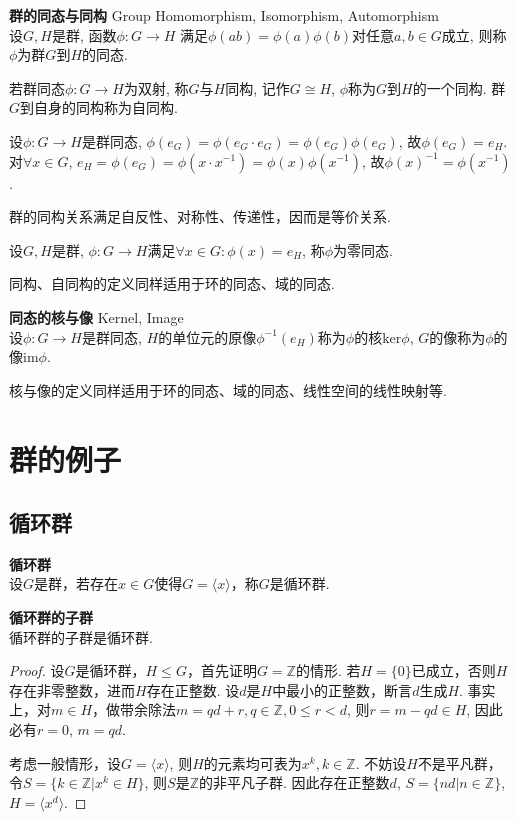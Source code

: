 \begin{dfn} \textbf{群的同态与同构} Group Homomorphism, Isomorphism, Automorphism\\
设$G,H$是群, 函数$\phi: G\to H$ 满足$\phi(ab)=\phi(a)\phi(b)$对任意$a,b\in G$成立, 则称$\phi$为群$G$到$H$的同态. 

若群同态$\phi:G\to H$为双射, 称$G$与$H$同构, 记作$G\cong H$, $\phi$称为$G$到$H$的一个同构. 群$G$到自身的同构称为自同构.
\end{dfn}
设$\phi: G\to H$是群同态, $\phi(e_G) = \phi(e_G\cdot e_G)=\phi(e_G)\phi(e_G)$, 故$\phi(e_G)=e_H$. 对$\forall x\in G$, $e_H=\phi(e_G)=\phi(x\cdot x^{-1})=\phi(x)\phi(x^{-1})$, 故$\phi(x)^{-1}=\phi(x^{-1})$.

\par 群的同构关系满足自反性、对称性、传递性，因而是等价关系. 

\par 设$G,H$是群, $\phi:G\to H$满足$\forall x\in G: \phi(x)=e_H$, 称$\phi$为零同态. 

\par 同构、自同构的定义同样适用于环的同态、域的同态. 

\begin{dfn} \textbf{同态的核与像} Kernel, Image\\
设$\phi: G\to H$是群同态, $H$的单位元的原像$\phi^{-1}(e_H)$称为$\phi$的核$\mathrm{ker}\phi$, $G$的像称为$\phi$的像$\mathrm{im}\phi$.
\end{dfn}
核与像的定义同样适用于环的同态、域的同态、线性空间的线性映射等. 

\section{群的例子}

\subsection{循环群}
\begin{dfn}
\textbf{循环群}\\
设$G$是群，若存在$x\in G$使得$G=\langle x \rangle$，称$G$是循环群.
\end{dfn}

\begin{pro}
\textbf{循环群的子群}\\
循环群的子群是循环群.
\end{pro}
\begin{proof}
设$G$是循环群，$H\le G$，首先证明$G=\mathbb{Z}$的情形. 若$H=\{0\}$已成立，否则$H$存在非零整数，进而$H$存在正整数. 设$d$是$H$中最小的正整数，断言$d$生成$H$. 事实上，对$m \in H$，做带余除法$m=qd+r, q\in \mathbb{Z}, 0\le r<d$, 则$r=m-qd \in H$, 因此必有$r=0$, $m=qd$.
\par 考虑一般情形，设$G=\langle x\rangle$, 则$H$的元素均可表为$x^k, k\in \mathbb{Z}$. 不妨设$H$不是平凡群，令$S=\{k\in \mathbb{Z} \vert x^k \in H\}$, 则$S$是$\mathbb{Z}$的非平凡子群. 因此存在正整数$d$, $S=\{nd\vert n \in \mathbb{Z}\}$, $H=\langle x^d \rangle$. 
\end{proof}

